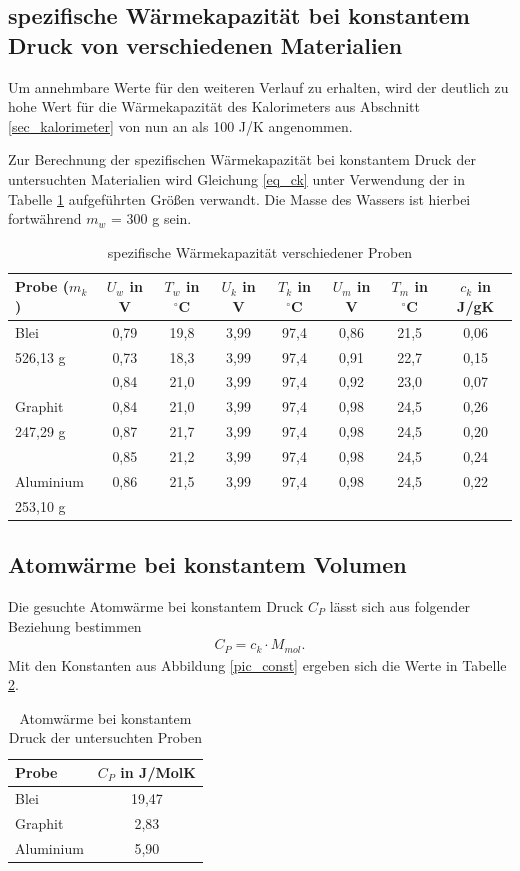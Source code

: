 \subsection[spezifische Wärmekapazität verschiedener Materialien]{spezifische Wärmekapazität bei konstantem Druck von verschiedenen Materialien}
Um annehmbare Werte für den weiteren Verlauf zu erhalten, wird der deutlich zu hohe Wert für die Wärmekapazität des Kalorimeters aus Abschnitt
\ref{sec_kalorimeter} von nun an als 100 J/K angenommen. 

Zur Berechnung der spezifischen Wärmekapazität bei konstantem Druck der untersuchten Materialien wird Gleichung \eqref{eq_ck} unter Verwendung der in Tabelle
\ref{tab_ck} aufgeführten Größen verwandt. Die Masse des Wassers ist hierbei fortwährend $m_w$ = 300 g sein.

\begin{table}[H]
 \begin{tabular}{|l|c|c|c|c|c|c|c|}
 Probe ($m_k$)& $U_w$ in V & $T_w$ in $^\circ$C & $U_k$ in V & $T_k$ in $^\circ$C & $U_m$ in V & $T_m$ in $^\circ$C & $c_k$ in J/gK\\
 \hline
Blei&	0,79&	19,8&	3,99&	97,4&	0,86&	21,5 & 0,06\\
526,13 g&	0,73&	18,3&	3,99&	97,4&	0,91&	22,7 & 0,15\\
	&0,84&	21,0&	3,99&	97,4&	0,92&	23,0 & 0,07\\
	\hline
Graphit	&0,84&	21,0&	3,99&	97,4&	0,98&	24,5 & 0,26\\
247,29	g&0,87&	21,7&	3,99&	97,4&	0,98&	24,5 & 0,20\\
	&0,85&	21,2&	3,99&	97,4&	0,98&	24,5 & 0,24\\
	\hline
Aluminium&	0,86&	21,5&	3,99&	97,4&	0,98&	24,5 & 0,22\\
253,10 g	& & & & & & &				\\ \hline

 \end{tabular}
\caption{spezifische Wärmekapazität verschiedener Proben}
\label{tab_ck}
\end{table}

\subsection{Atomwärme bei konstantem Volumen}
Die gesuchte Atomwärme bei konstantem Druck $C_P$ lässt sich aus folgender Beziehung bestimmen
\begin{align}
 C_P = c_k \cdot M_{mol}.
\end{align}
Mit den Konstanten aus Abbildung \ref{pic_const} ergeben sich die Werte in Tabelle \ref{tab_cp}.
\begin{table}[H]
 \begin{tabular}{l|c}
 Probe & $C_P$ in J/MolK\\
 \hline
Blei &19,47\\
Graphit &2,83\\
Aluminium &5,90
 \end{tabular}
\caption{Atomwärme bei konstantem Druck der untersuchten Proben}
\label{tab_cp}
\end{table}


